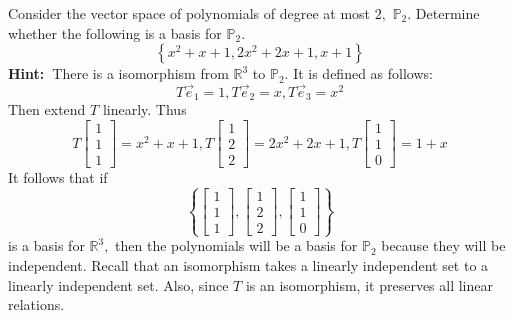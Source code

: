 \documentclass{ximera}
\begin{document}
\begin{problem}\label{prb:10.28} Consider the vector space of polynomials of degree at most $2,$ $%
\mathbb{P}_{2}$. Determine whether the following is a basis for $\mathbb{P}%
_{2}$.
\begin{equation*}
\left\{ x^{2}+x+1,2x^{2}+2x+1,x+1\right\}
\end{equation*}
\textbf{Hint:\ }There is a isomorphism from $\mathbb{R}^{3}$ to $\mathbb{P}
_{2}$. It is defined as follows:\
\begin{equation*}
T\vec{e}_{1}=1,T\vec{e}_{2}=x,T\vec{e}_{3}=x^{2}
\end{equation*}
Then extend $T$ linearly. Thus
\begin{equation*}
T\left[
\begin{array}{c}
1 \\
1 \\
1
\end{array}
\right] =x^{2}+x+1,T\left[
\begin{array}{c}
1 \\
2 \\
2
\end{array}
\right] =2x^{2}+2x+1,T\left[
\begin{array}{c}
1 \\
1 \\
0
\end{array}
\right] =1+x
\end{equation*}
It follows that if
\begin{equation*}
\left\{ \left[
\begin{array}{c}
1 \\
1 \\
1
\end{array}
\right] ,\left[
\begin{array}{c}
1 \\
2 \\
2
\end{array}
\right] ,\left[
\begin{array}{c}
1 \\
1 \\
0
\end{array}
\right] \right\}
\end{equation*}
is a basis for $\mathbb{R}^{3},$ then the polynomials will be a basis for $
\mathbb{P}_{2}$ because they will be independent. Recall that an isomorphism
takes a linearly independent set to a linearly independent set. Also, since $
T$ is an isomorphism, it preserves all linear relations.
\end{problem}
\end{document}
